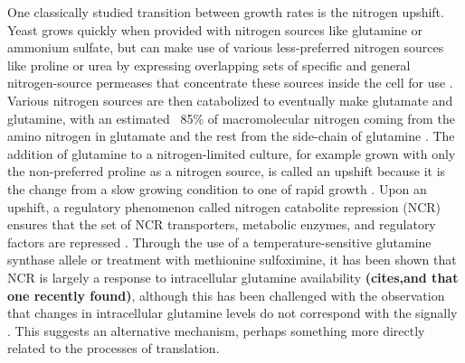 One classically studied transition between growth rates is the 
nitrogen upshift. Yeast grows quickly when provided with nitrogen 
sources like glutamine or ammonium sulfate, but can make use of 
various less-preferred nitrogen sources like proline or urea by 
expressing overlapping sets of specific and general nitrogen-source 
permeases that concentrate these sources inside the cell for use
\parencite{grenson1992amino}.
Various
nitrogen sources are then catabolized to eventually make glutamate and
glutamine, with an estimated ~85\% of macromolecular nitrogen coming
from the amino nitrogen in glutamate and the rest from the side-chain
of glutamine 
\parencite{magasanik2002nitrogen}. The addition of glutamine to
a nitrogen-limited culture, for example grown with only the
non-preferred proline as a nitrogen source, is called an upshift
because it is the change from a slow growing condition to one of rapid
growth \parencite{waldron1977synthesis}. 
Upon an upshift, a regulatory phenomenon called nitrogen
catabolite repression (NCR) ensures that the set of NCR transporters,
metabolic enzymes, and regulatory factors are repressed
\parencite{cooper1982nitrogen,cooper2002transmitting}. 
Through the use of a temperature-sensitive glutamine synthase
allele or treatment with methionine sulfoximine, it has been shown
that NCR is largely a response to intracellular glutamine 
availability 
\parencite{grenson1983inactivation,stracka2014nitrogen}
\textbf{(cites,and that one recently found)},
although this has been challenged with the observation that changes
in intracellular glutamine levels do not correspond with the signally
\parencite{fayyar2016}. This suggests an alternative mechanism,
perhaps something more directly related to the processes of
translation.

